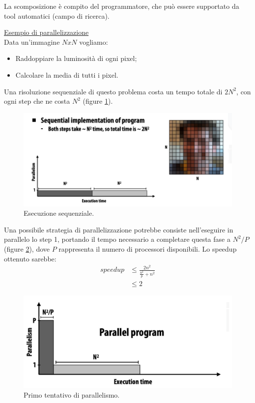 La scomposizione è compito del programmatore, che può essere supportato da tool automatici (campo di ricerca).

\underline{Esempio di parallelizzazione}
\\

Data un'immagine $NxN$ vogliamo:
\begin{itemize}
    \item Raddoppiare la luminosità di ogni pixel;
    \item Calcolare la media di tutti i pixel.
\end{itemize}

Una risoluzione sequenziale di questo problema costa un tempo totale di $2N^2$, con ogni step che ne costa $N^2$ (figure \ref{fig:esecuzione-sequenziale}). 
\begin{figure}[th]
	\centering
	\includegraphics[width=0.7\linewidth]{img/esecuzione-sequenziale.png}
	\caption{Esecuzione sequenziale.}
	\label{fig:esecuzione-sequenziale}
\end{figure}

Una possibile strategia di parallelizzazione potrebbe consiste nell'eseguire in parallelo lo step 1, portando il tempo necessario a completare questa fase a $N^2/P$ (figure \ref{fig:esecuzione-parallela-1}), dove $P$ rappresenta il numero di processori disponibili. Lo speedup ottenuto sarebbe:
\begin{align*}
    speedup &\le \frac{2n^2}{\frac{n^2}{p} + n^2}\\
    &\le 2
\end{align*}

\begin{figure}[th]
	\centering
	\includegraphics[width=0.7\linewidth]{img/esecuzione-parallela-1.png}
	\caption{Primo tentativo di parallelismo.}
	\label{fig:esecuzione-parallela-1}
\end{figure}


